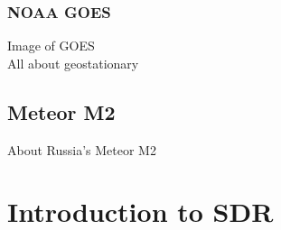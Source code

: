 \documentclass[]{beamer}
\begin{document}
\subsubsection{NOAA GOES}
\begin{frame}
    Image of GOES\\
    All about geostationary
\end{frame}
\subsection{Meteor M2}
\begin{frame}
    About Russia's Meteor M2
\end{frame}
\section{Introduction to SDR}
\end{document}
